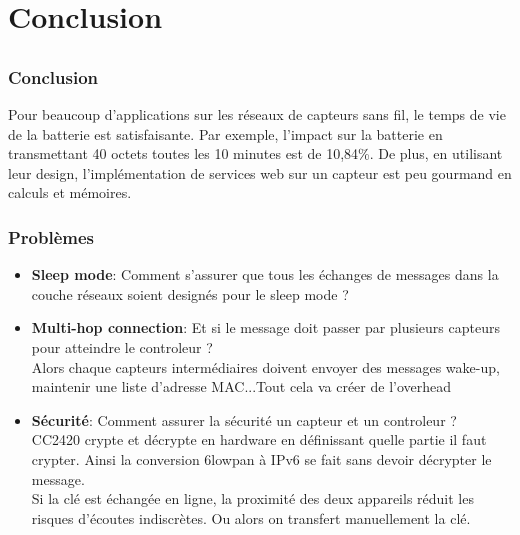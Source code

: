 \section{Conclusion}
\subsection{}
\begin{frame}
 \frametitle{Conclusion}
 Pour beaucoup d'applications sur les réseaux de capteurs sans fil, le temps de vie de la batterie est satisfaisante.
 Par exemple, l'impact sur la batterie en transmettant 40 octets toutes les 10 minutes est de 10,84\%.
 De plus, en utilisant leur design, l'implémentation de services web sur un capteur est peu gourmand en calculs et mémoires.
\end{frame}

\begin{frame}
 \frametitle{Problèmes}
 \begin{itemize}
  \item \textbf{Sleep mode}: Comment s'assurer que tous les échanges de messages dans la couche réseaux soient designés pour le sleep mode ?
  \item \textbf{Multi-hop connection}: Et si le message doit passer par plusieurs capteurs pour atteindre le controleur ?\\
  Alors chaque capteurs intermédiaires doivent envoyer des messages wake-up, maintenir une liste d'adresse MAC...Tout cela va créer de l'overhead
  \item \textbf{Sécurité}: Comment assurer la sécurité un capteur et un controleur ?\\
  CC2420 crypte et décrypte en hardware en définissant quelle partie il faut crypter.
  Ainsi la conversion 6lowpan à IPv6 se fait sans devoir décrypter le message.\\
  Si la clé est échangée en ligne, la proximité des deux appareils réduit les risques d'écoutes indiscrètes.
  Ou alors on transfert manuellement la clé.
 \end{itemize}
\end{frame}
